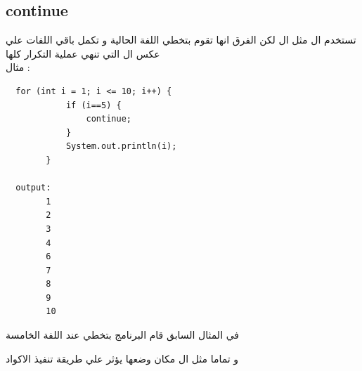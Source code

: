 \subsection{continue}
\begin{AR}
  تستخدم ال  مثل ال  
  لكن الفرق انها تقوم بتخطي اللفة الحالية و تكمل باقي اللفات
  علي عكس ال  التي تنهي عملية التكرار كلها
  \\
  مثال :
\end{AR}
\begin{verbatim}
  for (int i = 1; i <= 10; i++) {
            if (i==5) {
                continue;
            }
            System.out.println(i);
        }

  output: 
        1
        2
        3
        4
        6
        7
        8
        9
        10
\end{verbatim}
\begin{AR}
  في المثال السابق قام البرنامج بتخطي عند اللفة الخامسة
  \par
  و تماما مثل ال  مكان وضعها يؤثر علي طريقة تنفيذ الاكواد
\end{AR}
\newpage

